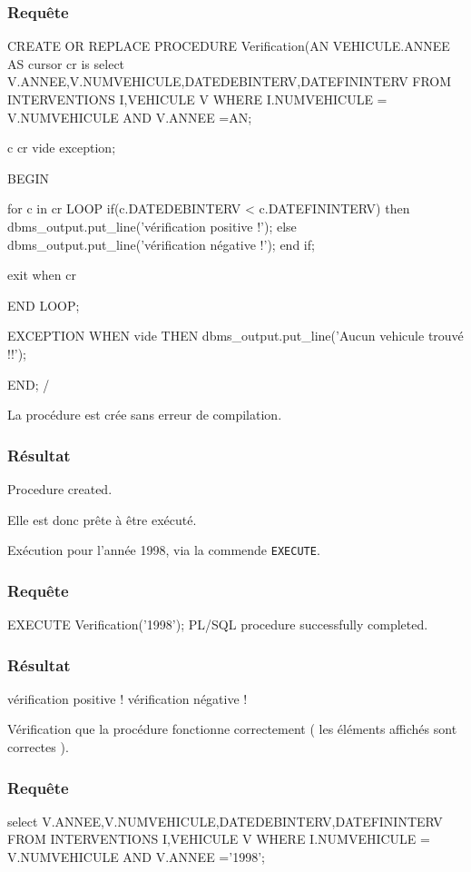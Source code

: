 \documentclass[•]{article}
\begin{document}
\subsubsection{Requête}
\begin{sql}
CREATE OR REPLACE PROCEDURE Verification(AN VEHICULE.ANNEE%
AS
cursor cr is select V.ANNEE,V.NUMVEHICULE,DATEDEBINTERV,DATEFININTERV 
FROM INTERVENTIONS I,VEHICULE V 
WHERE I.NUMVEHICULE = V.NUMVEHICULE AND V.ANNEE =AN;

c cr%
vide exception;

BEGIN

for c in cr LOOP
	if(c.DATEDEBINTERV < c.DATEFININTERV)
	then
		dbms_output.put_line('vérification positive !');
	else
		dbms_output.put_line('vérification négative !');
	end if;
	
	exit when cr%

END LOOP;

EXCEPTION WHEN vide THEN
	dbms_output.put_line('Aucun vehicule trouvé !!');

END;
/
\end{sql}

La procédure est crée sans erreur de compilation. 
\subsubsection{Résultat}
\begin{sql}
Procedure created.
\end{sql}
Elle est donc prête à être exécuté.

Exécution pour l'année 1998, via la commende \texttt{EXECUTE}.
\subsubsection{Requête}
\begin{sql}
EXECUTE Verification('1998');
PL/SQL procedure successfully completed.
\end{sql}
\subsubsection{Résultat}
\begin{sql}
vérification positive !
vérification négative !
\end{sql}

Vérification que la procédure fonctionne correctement ( les éléments affichés sont correctes ).

\subsubsection{Requête}
\begin{sql}
select V.ANNEE,V.NUMVEHICULE,DATEDEBINTERV,DATEFININTERV 
FROM INTERVENTIONS I,VEHICULE V 
WHERE I.NUMVEHICULE = V.NUMVEHICULE AND V.ANNEE ='1998';
\end{sql}
\end{document}
